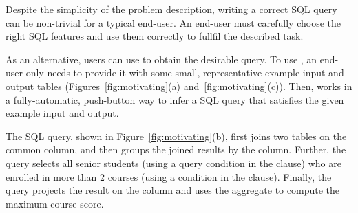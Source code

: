 Despite the simplicity of the problem description,
writing a correct SQL query  can be non-trivial for a typical
end-user. An end-user must carefully choose the
right SQL features and use them correctly
to fullfil the described task.

As an alternative, users can use \ourtool to obtain
the desirable query.
To use \ourtool, an end-user only needs to provide it with
some small, representative example input and output tables
(Figures~\ref{fig:motivating}(a) and~\ref{fig:motivating}(c)).
Then, \ourtool works in a fully-automatic, push-button
way to infer a SQL query that satisfies the given
example input and output.


The SQL query, shown in Figure~\ref{fig:motivating}(b),
first joins two tables on the common  column,
and then groups the joined results by the 
column. Further, the query selects all senior
students (using a query condition in the 
clause) who are enrolled in more than 2 courses
(using a condition in the  clause).
Finally, the query projects the result on the
 column and uses the  aggregate
to compute the maximum course score.







